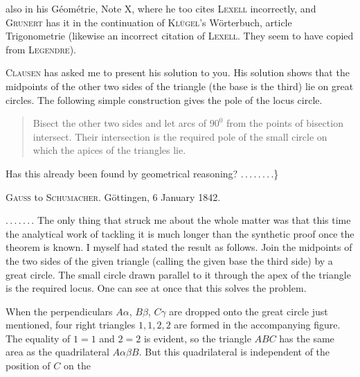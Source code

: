 also in his Géométrie, Note X, where he too cites \textsc{Lexell} incorrectly, and \textsc{Grunert} has it in the continuation of \textsc{Klügel}'s Wörterbuch, article Trigonometrie (likewise an incorrect citation of \textsc{Lexell}. They seem to have copied from \textsc{Legendre}).

\textsc{Clausen} has asked me to present his solution to you. His solution shows that the midpoints of the other two sides of the triangle (the base is the third) lie on great circles. The following simple construction gives the pole of the locus circle.

\begin{quote}
Bisect the other two sides and let arcs of $90^0$ from the points of bisection intersect. Their intersection is the required pole of the small circle on which the apices of the triangles lie.
\end{quote}

Has this already been found by geometrical reasoning? \mbox{.\,.\,.\,.\,.\,.\,.\,.}\}

\medskip

\begin{center}
\textsc{Gauss} to \textsc{Schumacher}. Göttingen, 6 January 1842.
\end{center}

\mbox{.\,.\,.\,.\,.\,.\,.} The only thing that struck me about the whole matter was that this time the analytical work of tackling it is much longer than the synthetic proof once the theorem is known. I myself had stated the result as follows. Join the midpoints of the two sides of the given triangle (calling the given base the third side) by a great circle. The small circle drawn parallel to it through the apex of the triangle is the required locus. One can see at once that this solves the problem.

\begin{center}\end{center}

When the perpendiculars $A\alpha$, $B\beta$, $C\gamma$ are dropped onto the great circle just mentioned, four right triangles $1,1,2,2$ are formed in the accompanying figure. The equality of $1=1$ and $2=2$ is evident, so the triangle $ABC$ has the same area as the quadrilateral $A\alpha\beta B$. But this quadrilateral is independent of the position of $C$ on the\space%
